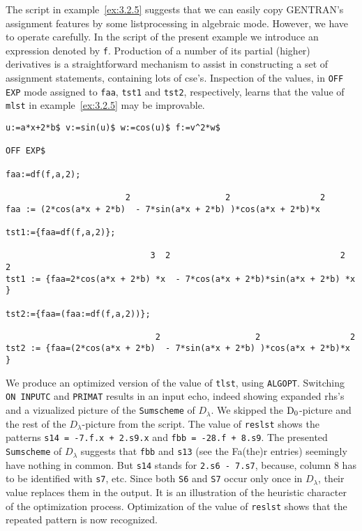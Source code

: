 The script in example~\ref{ex:3.2.5} suggests that we can easily copy GENTRAN's
assignment features by some listprocessing in algebraic mode. However, we
have to operate carefully. In the script of the present example we introduce an
expression denoted by {\tt f}. Production of a number of its partial (higher)
derivatives is a straightforward mechanism to assist in constructing a set
of assignment statements, containing lots of cse's. Inspection of the values,
in {\tt OFF EXP} mode assigned to {\tt faa}, {\tt tst1} and {\tt tst2},
respectively, learns that the value of {\tt mlst} in example~\ref{ex:3.2.5}
may be improvable.
{\small
\begin{verbatim}
u:=a*x+2*b$ v:=sin(u)$ w:=cos(u)$ f:=v^2*w$

OFF EXP$

faa:=df(f,a,2);

                        2                   2                  2
faa := (2*cos(a*x + 2*b)  - 7*sin(a*x + 2*b) )*cos(a*x + 2*b)*x

tst1:={faa=df(f,a,2)};

                             3  2                                  2  2
tst1 := {faa=2*cos(a*x + 2*b) *x  - 7*cos(a*x + 2*b)*sin(a*x + 2*b) *x }

tst2:={faa=(faa:=df(f,a,2))};

                              2                   2                  2
tst2 := {faa=(2*cos(a*x + 2*b)  - 7*sin(a*x + 2*b) )*cos(a*x + 2*b)*x }
\end{verbatim}}
We produce an optimized version of the value of {\tt tlst}, using {\tt ALGOPT}.
Switching {\tt ON INPUTC} and {\tt PRIMAT} results in an input echo, indeed
showing expanded rhs's and a vizualized picture of the \verb+Sumscheme+ of
$D_{\lambda}$. We skipped the ${\rm D_0}$-picture and the rest of the
$D_{\lambda}$-picture from the script. The value of {\tt reslst} shows the
patterns {\tt s14 = -7.f.x + 2.s9.x} and {\tt fbb = -28.f + 8.s9}.
The presented \verb+Sumscheme+ of $D_{\lambda}$ suggests that {\tt fbb} and
{\tt s13} (see the Fa(the)r entries) seemingly have
nothing in common. But {\tt s14} stands for {\tt 2.s6 - 7.s7}, because,
column 8 has to be identified with {\tt s7}, etc. Since both {\tt S6} and
{\tt S7} occur only once in $D_{\lambda}$, their value replaces them in the
output.
It is an illustration of the heuristic character of the optimization process.
Optimization of the value of {\tt reslst} shows that the repeated pattern
is now recognized.
